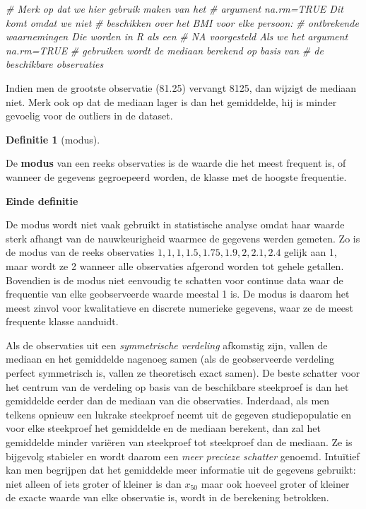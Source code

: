 \documentclass[
  12pt,dutch,coursenotes]{book}
\newenvironment{Shaded}{\begin{snugshade}}{\end{snugshade}}
\newcommand{\CommentTok}[1]{\textcolor[rgb]{0.56,0.35,0.01}{\textit{#1}}}
\theoremstyle{definition}
\newtheorem{definition}{Definitie}[chapter]
\theoremstyle{definition}
\theoremstyle{definition}
\theoremstyle{remark}
\begin{document}
\begin{Shaded}
\begin{Highlighting}[]
\CommentTok{\# Merk op dat we hier gebruik maken van het}
\CommentTok{\# argument na.rm=TRUE Dit komt omdat we niet}
\CommentTok{\# beschikken over het BMI voor elke persoon:}
\CommentTok{\# ontbrekende waarnemingen Die worden in R als een}
\CommentTok{\# NA voorgesteld Als we het argument na.rm=TRUE}
\CommentTok{\# gebruiken wordt de mediaan berekend op basis van}
\CommentTok{\# de beschikbare observaties}
\end{Highlighting}
\end{Shaded}

Indien men de grootste observatie (81.25) vervangt 8125, dan wijzigt de mediaan niet.
Merk ook op dat de mediaan lager is dan het gemiddelde, hij is minder gevoelig voor de outliers in de dataset.

\begin{definition}[modus]
\protect\hypertarget{def:unnamed-chunk-97}{}{\label{def:unnamed-chunk-97} \iffalse (modus) \fi{} }
\end{definition}
De \textbf{modus} van een reeks observaties is de waarde die het meest
frequent is, of wanneer de gegevens gegroepeerd worden, de klasse met de
hoogste frequentie.

\textbf{Einde definitie}

De modus wordt niet vaak gebruikt in statistische analyse omdat haar waarde
sterk afhangt van de nauwkeurigheid waarmee de gegevens werden gemeten. Zo
is de modus van de reeks observaties \(1, 1, 1, 1.5, 1.75, 1.9, 2, 2.1, 2.4\)
gelijk aan 1, maar wordt ze 2 wanneer alle observaties afgerond worden tot
gehele getallen. Bovendien is de modus niet eenvoudig te schatten voor
continue data waar de frequentie van elke geobserveerde waarde meestal 1 is.
De modus is daarom het meest zinvol voor kwalitatieve en discrete numerieke
gegevens, waar ze de meest frequente klasse aanduidt.

Als de observaties uit een \emph{symmetrische verdeling} afkomstig zijn,
vallen de mediaan en het gemiddelde nagenoeg samen (als de geobserveerde
verdeling perfect symmetrisch is, vallen ze theoretisch exact samen).
De beste schatter voor het centrum van de verdeling op basis van de beschikbare
steekproef is dan het gemiddelde eerder dan de mediaan van die observaties.
Inderdaad, als men telkens opnieuw een lukrake steekproef neemt uit de
gegeven studiepopulatie en voor elke steekproef het gemiddelde en de mediaan
berekent, dan zal het gemiddelde minder variëren van steekproef tot
steekproef dan de mediaan. Ze is bijgevolg stabieler en wordt daarom een
\emph{meer precieze schatter} genoemd. Intuïtief kan men begrijpen dat
het gemiddelde meer informatie uit de gegevens gebruikt: niet alleen of iets
groter of kleiner is dan \(x_{50}\) maar ook hoeveel groter of kleiner de
exacte waarde van elke observatie is, wordt in de berekening betrokken.
\end{document}
